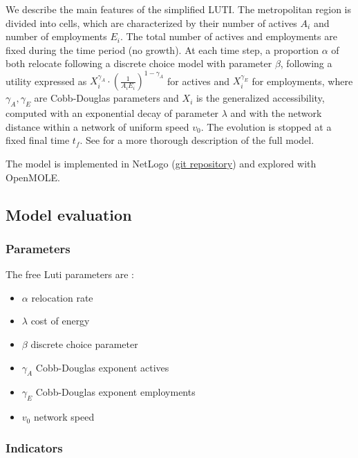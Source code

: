 We describe the main features of the simplified LUTI. The metropolitan region is divided into cells, which are characterized by their number of actives $A_i$ and number of employments $E_i$. The total number of actives and employments are fixed during the time period (no growth). At each time step, a proportion $\alpha$ of both relocate following a discrete choice model with parameter $\beta$, following a utility expressed as $X_i^{\gamma_A} \cdot \left(\frac{1}{A_i E_i}\right)^{1 - \gamma_A}$ for actives and $X_i^{\gamma_E}$ for employments, where $\gamma_A,\gamma_E$ are Cobb-Douglas parameters and $X_i$ is the generalized accessibility, computed with an exponential decay of parameter $\lambda$ and with the network distance within a network of uniform speed $v_0$. The evolution is stopped at a fixed final time $t_f$. See \cite{raimbault2018phdthesis} for a more thorough description of the full model.

The model is implemented in NetLogo (\href{https://github.com/JusteRaimbault/Governance}{git repository}) and explored with OpenMOLE.



\subsection{Model evaluation}

\subsubsection{Parameters}

The free Luti parameters are :
\begin{itemize}
	\item $\alpha$ relocation rate
	\item $\lambda$ cost of energy
	\item $\beta$ discrete choice parameter
	\item $\gamma_A$ Cobb-Douglas exponent actives
	\item $\gamma_E$ Cobb-Douglas exponent employments
	\item $v_0$ network speed
\end{itemize}


\subsubsection{Indicators}

